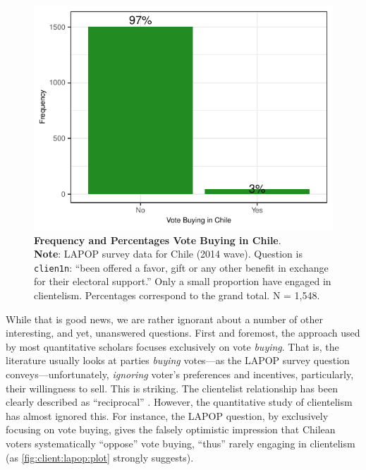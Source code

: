 \documentclass[onesided]{article}\usepackage[]{graphicx}\usepackage[]{color}
\makeatletter
\def\maxwidth{ %
  \ifdim\Gin@nat@width>\linewidth
    \linewidth
  \else
    \Gin@nat@width
  \fi
}
\newenvironment{knitrout}{}{} %
\makeatother
\begin{document}
\begin{knitrout}
\color{fgcolor}\begin{figure}[h]

{\centering \includegraphics[width=\maxwidth]{figure/client:lapop:plot-1} 

}

\caption{{\bf Frequency and Percentages Vote Buying in Chile}. \\\hspace{\textwidth} {\bf Note}: LAPOP survey data for Chile (2014 wave). Question is \texttt{clien1n}: ``been offered a favor, gift or any other benefit in exchange for their electoral support.'' Only a small proportion have engaged in clientelism. Percentages correspond to the grand total. N = 1,548. 
}\label{fig:client:lapop:plot}
\end{figure}


\end{knitrout}


%
While that is good news, we are rather ignorant about a number of other interesting, and yet, unanswered questions. First and foremost, the approach used by most quantitative scholars focuses exclusively on vote \emph{buying}. That is, the literature usually looks at parties \emph{buying} votes---as the LAPOP survey question conveys---unfortunately, \emph{ignoring} voter's preferences and incentives, particularly, their willingness to sell. This is striking. The clientelist relationship has been clearly described as ``reciprocal'' \parencite[]{Auyero2000}. However, the quantitative study of clientelism has almost ignored this. For instance, the LAPOP question, by exclusively focusing on vote buying, gives the falsely optimistic impression that Chilean voters systematically ``oppose'' vote buying, ``thus'' rarely engaging in clientelism (as \autoref{fig:client:lapop:plot} strongly suggests). 
\end{document}
